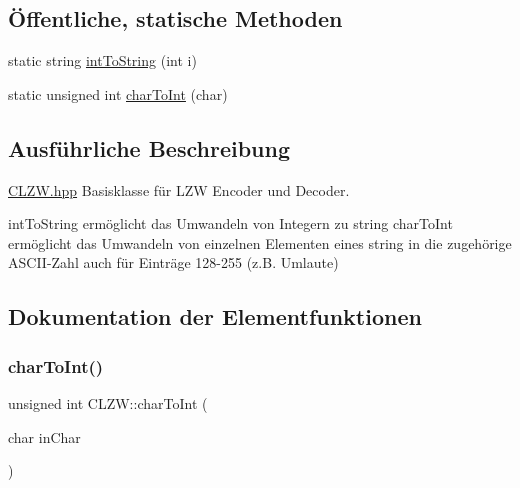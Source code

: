 \subsection*{Öffentliche, statische Methoden}
\begin{DoxyCompactItemize}
\item 
static string \hyperlink{class_c_l_z_w_a7cd7b5a245b1b3a0eb1905d3a8e2be89}{int\+To\+String} (int i)
\item 
static unsigned int \hyperlink{class_c_l_z_w_ad7b0dd957592e723dea646d3e02771aa}{char\+To\+Int} (char)
\end{DoxyCompactItemize}


\subsection{Ausführliche Beschreibung}
\hyperlink{_c_l_z_w_8hpp}{C\+L\+Z\+W.\+hpp} Basisklasse für L\+ZW Encoder und Decoder. 

int\+To\+String ermöglicht das Umwandeln von Integern zu string char\+To\+Int ermöglicht das Umwandeln von einzelnen Elementen eines string in die zugehörige A\+S\+C\+I\+I-\/\+Zahl auch für Einträge 128-\/255 (z.\+B. Umlaute) 

\subsection{Dokumentation der Elementfunktionen}
\mbox{\label{class_c_l_z_w_ad7b0dd957592e723dea646d3e02771aa}} 
\subsubsection{\texorpdfstring{char\+To\+Int()}{charToInt()}}
{\footnotesize\ttfamily unsigned int C\+L\+Z\+W\+::char\+To\+Int (\begin{DoxyParamCaption}\item[{char}]{in\+Char }\end{DoxyParamCaption})\hspace{0.3cm}{\ttfamily [static]}}

